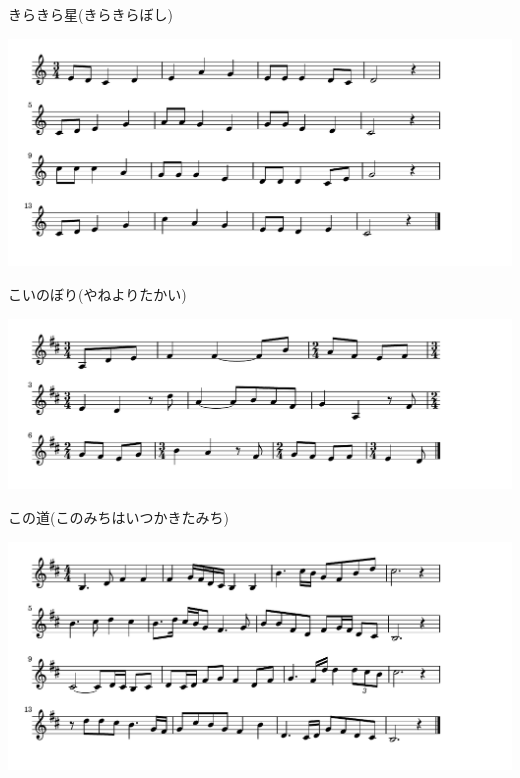 \documentclass[a4paper]{ltjsarticle}
\begin{document}
\vspace{-10mm} \hspace{10mm}
きらきら星(きらきらぼし)



\includegraphics[clip]{koinobori_crop.pdf}

\vspace{-10mm} \hspace{10mm}
こいのぼり(やねよりたかい)



\includegraphics[clip]{konomichi_crop.pdf}

\vspace{-10mm} \hspace{10mm}
この道(このみちはいつかきたみち)



\includegraphics[clip]{konoyonohana_crop.pdf}
\end{document}
